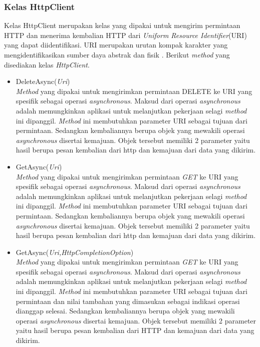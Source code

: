 \subsubsection{Kelas HttpClient}
\label{subsubsec:Kelas HttpClient}
\hspace{0.5cm} Kelas HttpClient merupakan kelas yang dipakai untuk mengirim permintaan HTTP dan menerima kembalian HTTP dari \textit{Uniform Resource Identifier}(URI) yang dapat diidentifikasi. URI merupakan urutan kompak karakter yang mengidentifikasikan sumber daya abstrak dan fisik \cite{rfc3986}. Berikut \textit{method} yang disediakan kelas \textit{HttpClient}.
\begin{itemize}
	\item DeleteAsync(\textit{Uri}) \\
	\textit{Method} yang dipakai untuk mengirimkan permintaan DELETE ke URI yang spesifik sebagai operasi \textit{asynchronous}. Maksud dari operasi \textit{asynchronous} adalah memungkinkan aplikasi untuk melanjutkan pekerjaan selagi \textit{method} ini dipanggil\footnotemark[2]. \textit{Method} ini membutuhkan parameter URI sebagai tujuan dari permintaan. Sedangkan kembaliannya berupa objek yang mewakili operasi \textit{asynchronous} disertai kemajuan. Objek tersebut memiliki 2 parameter yaitu hasil berupa pesan kembalian dari http dan kemajuan dari data yang dikirim.
	\item GetAsync(\textit{Uri}) \\
	\textit{Method} yang dipakai untuk mengirimkan permintaan \textit{GET} ke URI yang spesifik sebagai operasi \textit{asynchronous}. Maksud dari operasi \textit{asynchronous} adalah memungkinkan aplikasi untuk melanjutkan pekerjaan selagi \textit{method} ini dipanggil\footnotemark[2]. \textit{Method} ini membutuhkan parameter URI sebagai tujuan dari permintaan. Sedangkan kembaliannya berupa objek yang mewakili operasi \textit{asynchronous} disertai kemajuan. Objek tersebut memiliki 2 parameter yaitu hasil berupa pesan kembalian dari http dan kemajuan dari data yang dikirim.
	\item GetAsync(\textit{Uri,HttpCompletionOption}) \\
	\textit{Method} yang dipakai untuk mengirimkan permintaan \textit{GET} ke URI yang spesifik sebagai operasi \textit{asynchronous}. Maksud dari operasi \textit{asynchronous} adalah memungkinkan aplikasi untuk melanjutkan pekerjaan selagi \textit{method} ini dipanggil\footnotemark[2]. \textit{Method} ini membutuhkan parameter URI sebagai tujuan dari permintaan dan nilai tambahan yang dimasukan sebagai indikasi operasi dianggap selesai. Sedangkan kembaliannya berupa objek yang mewakili operasi \textit{asynchronous} disertai kemajuan. Objek tersebut memiliki 2 parameter yaitu hasil berupa pesan kembalian dari HTTP dan kemajuan dari data yang dikirim.

\end{itemize}
